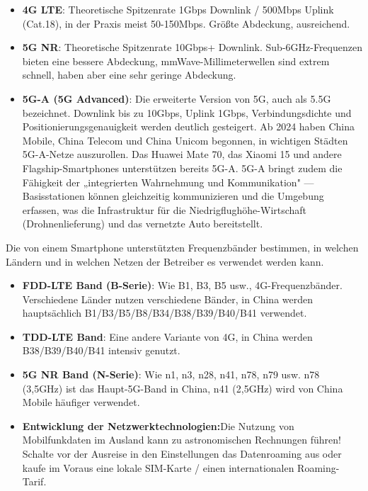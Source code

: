 \begin{itemize}
  \item \textbf{4G LTE}: Theoretische Spitzenrate 1Gbps Downlink / 500Mbps Uplink (Cat.18), in der Praxis meist 50-150Mbps. Größte Abdeckung, ausreichend.
  \item \textbf{5G NR}: Theoretische Spitzenrate 10Gbps+ Downlink. Sub-6GHz-Frequenzen bieten eine bessere Abdeckung, mmWave-Millimeterwellen sind extrem schnell, haben aber eine sehr geringe Abdeckung.
  \item \textbf{5G-A (5G Advanced)}: Die erweiterte Version von 5G, auch als 5.5G bezeichnet. Downlink bis zu 10Gbps, Uplink 1Gbps, Verbindungsdichte und Positionierungsgenauigkeit werden deutlich gesteigert. Ab 2024 haben China Mobile, China Telecom und China Unicom begonnen, in wichtigen Städten 5G-A-Netze auszurollen. Das Huawei Mate 70, das Xiaomi 15 und andere Flagship-Smartphones unterstützen bereits 5G-A. 5G-A bringt zudem die Fähigkeit der „integrierten Wahrnehmung und Kommunikation" — Basisstationen können gleichzeitig kommunizieren und die Umgebung erfassen, was die Infrastruktur für die Niedrigflughöhe-Wirtschaft (Drohnenlieferung) und das vernetzte Auto bereitstellt.
\end{itemize}


Die von einem Smartphone unterstützten Frequenzbänder bestimmen, in welchen Ländern und in welchen Netzen der Betreiber es verwendet werden kann.

\begin{itemize}
  \item \textbf{FDD-LTE Band (B-Serie)}: Wie B1, B3, B5 usw., 4G-Frequenzbänder. Verschiedene Länder nutzen verschiedene Bänder, in China werden hauptsächlich B1/B3/B5/B8/B34/B38/B39/B40/B41 verwendet.
  \item \textbf{TDD-LTE Band}: Eine andere Variante von 4G, in China werden B38/B39/B40/B41 intensiv genutzt.
  \item \textbf{5G NR Band (N-Serie)}: Wie n1, n3, n28, n41, n78, n79 usw. n78 (3,5GHz) ist das Haupt-5G-Band in China, n41 (2,5GHz) wird von China Mobile häufiger verwendet.
  \item \textbf{Entwicklung der Netzwerktechnologien:}Die Nutzung von Mobilfunkdaten im Ausland kann zu astronomischen Rechnungen führen! Schalte vor der Ausreise in den Einstellungen das Datenroaming aus oder kaufe im Voraus eine lokale SIM-Karte / einen internationalen Roaming-Tarif.
\end{itemize}

